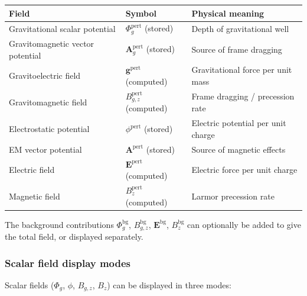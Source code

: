 \documentclass[11pt,a4paper]{article}
\newcommand{\vv}[1]{\mathbf{#1}}
\newcommand{\Phig}{\Phi_g}
\newcommand{\Ag}{\vv{A}_g}
\begin{document}
\begin{center}
\begin{tabular}{@{}L{4cm}L{4.5cm}L{4cm}@{}}
\toprule
\textbf{Field} & \textbf{Symbol} & \textbf{Physical meaning} \\
\midrule
Gravitational scalar potential & $\Phig^{\mathrm{pert}}$ (stored) & Depth of gravitational well \\
Gravitomagnetic vector potential & $\Ag^{\mathrm{pert}}$ (stored) & Source of frame dragging \\
Gravitoelectric field & $\vv{g}^{\mathrm{pert}}$ (computed) & Gravitational force per unit mass \\
Gravitomagnetic field & $B_{g,z}^{\mathrm{pert}}$ (computed) & Frame dragging / precession rate \\
Electrostatic potential & $\phi^{\mathrm{pert}}$ (stored) & Electric potential per unit charge \\
EM vector potential & $\vv{A}^{\mathrm{pert}}$ (stored) & Source of magnetic effects \\
Electric field & $\vv{E}^{\mathrm{pert}}$ (computed) & Electric force per unit charge \\
Magnetic field & $B_z^{\mathrm{pert}}$ (computed) & Larmor precession rate \\
\bottomrule
\end{tabular}
\end{center}

The background contributions $\Phig^{\mathrm{bg}}$, $B_{g,z}^{\mathrm{bg}}$, $\vv{E}^{\mathrm{bg}}$, $B_z^{\mathrm{bg}}$ can optionally be added to give the total field, or displayed separately.

\subsubsection*{Scalar field display modes}

Scalar fields ($\Phig$, $\phi$, $B_{g,z}$, $B_z$) can be displayed in three modes:
\end{document}
